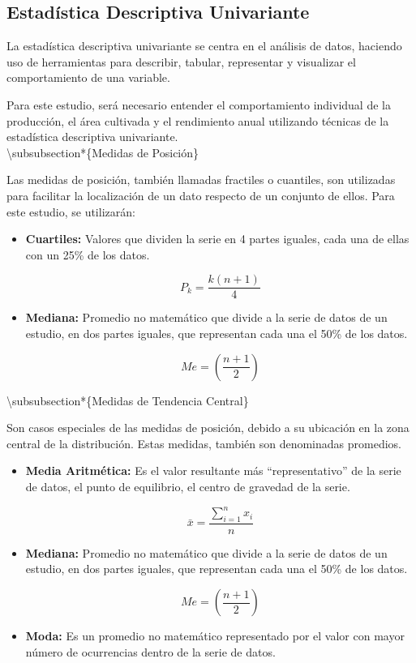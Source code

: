 \documentclass[oneside,11pt]{Latex/Classes/PhDthesisPSnPDF}
\begin{document}
\hfill\break

\subsection{Estadística Descriptiva Univariante}

La estadística descriptiva univariante se centra en el análisis de
datos, haciendo uso de herramientas para describir, tabular, representar
y visualizar el comportamiento de una variable.

Para este estudio, será necesario entender el comportamiento individual
de la producción, el área cultivada y el rendimiento anual utilizando
técnicas de la estadística descriptiva univariante.\\

\textbackslash subsubsection*\{Medidas de Posición\}

Las medidas de posición, también llamadas fractiles o cuantiles, son
utilizadas para facilitar la localización de un dato respecto de un
conjunto de ellos. Para este estudio, se utilizarán:

\begin{itemize}
\item{\textbf{Cuartiles:} Valores que dividen la serie en 4 partes iguales, cada una de ellas con un 25\% de los datos.}

$$P_k = \frac{k(n + 1)}{4}$$

\item{\textbf{Mediana:} Promedio no matemático que divide a la serie de datos de un estudio, en dos partes iguales, que representan cada una el 50\% de los datos.}

$$Me = \left(\frac{n+1}{2}\right)$$
\end{itemize}

\hfill\break

\textbackslash subsubsection*\{Medidas de Tendencia Central\}

Son casos especiales de las medidas de posición, debido a su ubicación
en la zona central de la distribución. Estas medidas, también son
denominadas promedios.

\begin{itemize}
\item{\textbf{Media Aritmética:} Es el valor resultante más “representativo” de la serie de datos, el punto de equilibrio, el centro de gravedad de la serie.}

$$\bar{x} = \frac{\sum_{i=1}^{n} x_i}{n}$$

\item{\textbf{Mediana:} Promedio no matemático que divide a la serie de datos de un estudio, en dos partes iguales, que representan cada una el 50\% de los datos.}

 $$Me = \left(\frac{n+1}{2}\right)$$

\item{\textbf{Moda:} Es un promedio no matemático representado por el valor con mayor número de ocurrencias dentro de la serie de datos.}
\end{itemize}
\end{document}
